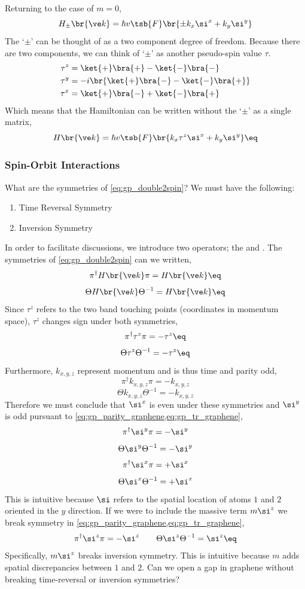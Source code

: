 \documentclass{article}
\begin{document}
Returning to the case of $m=0$,
\[ H_{\pm}\br{\ve k} =\hbar v\tsb{F} \br{\pm k_x \si^x + k_y \si^{y}} \]
The `$\pm$' can be thought of as a two component degree of freedom. Because there are two components, we can think of `$\pm$' as another pseudo-spin value $\tau$.
\begin{align*}
    \tau^{z} &= \ket{+} \bra{+} - \ket{-}\bra{-} \\
    \tau^{y} &= -i\br{\ket{+} \bra{-} - \ket{-}\bra{+}} \\
    \tau^{x} &= \ket{+} \bra{-} + \ket{-}\bra{+}
\end{align*}
Which means that the Hamiltonian can be written without the `$\pm$' as a single matrix,
\[ H\br{\ve k} =\hbar v\tsb{F} \br{k_x \tau^{z} \si^x + k_y \si^{y}} \eq \label{eq:gp_double2spin}\]

\subsubsection{Spin-Orbit Interactions}
\label{sec:soi}
What are the symmetries of \cref{eq:gp_double2spin}? We must have the following:
\begin{enumerate}
    \item Time Reversal Symmetry
    \item Inversion Symmetry
\end{enumerate}
In order to facilitate discussions, we introduce two operators; the  and . The symmetries of \cref{eq:gp_double2spin} can we written,
\[  \pi^{\dagger} H\br{\ve k} \pi = H\br{\ve k} \eq \label{eq:gp_parity_graphene}\]
\[  \Theta H\br{\ve k} \Theta^{-1} = H\br{\ve k} \eq \label{eq:gp_tr_graphene}\]
Since $\tau^{z}$ refers to the two band touching points (coordinates in momentum space), $\tau^{z}$ changes sign under both symmetries,
\[ \pi^{\dagger} \tau^{z} \pi = - \tau^{z} \eq \label{eq:gp_tau_z_sym_parity}\]
\[ \Theta \tau^{z} \Theta^{-1} = - \tau^{z} \eq \label{eq:gp_tau_z_sym_tr}\]
Furthermore, $k_{x, y, z}$ represent momentum and is thus time and parity odd,
\[ \pi^{\dagger} k_{x,y,z} \pi = - k_{x,y,z} \]
\[ \Theta k_{x,y,z} \Theta^{-1} = - k_{x,y,z} \]
Therefore we must conclude that $\si^{x}$ is even under these symmetries and $\si^{y}$ is odd pursuant to \cref{eq:gp_parity_graphene,eq:gp_tr_graphene},
\[ \pi^{\dagger} \si^{y} \pi = - \si^{y} \]
\[ \Theta \si^{y} \Theta^{-1} = - \si^{y} \]
\[ \pi^{\dagger} \si^{x} \pi = + \si^{x} \]
\[ \Theta \si^{x} \Theta^{-1} = + \si^{x} \]
This is intuitive because $\si$ refers to the spatial location of atoms $1$ and $2$ oriented in the $y$ direction.
If we were to include the massive term $m\si^{z}$ we break symmetry in \cref{eq:gp_parity_graphene,eq:gp_tr_graphene},
\[ \pi^{\dagger} \si^{z} \pi = - \si^{z} \qquad \Theta \si^{z} \Theta^{-1} = \si^{z} \eq \label{eq:gp_si_z_sym}\]
Specifically, $m \si^{z}$ breaks inversion symmetry. This is intuitive because $m$ adds spatial discrepancies between $1$ and $2$. Can we open a gap in graphene without breaking time-reversal or inversion symmetries?\\
\end{document}
